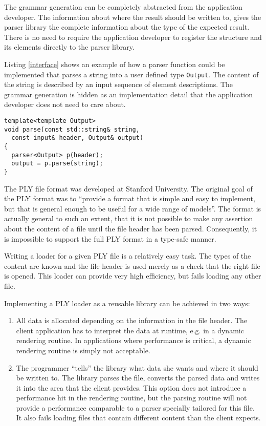\documentclass[a4paper,parskip=half,twocolumn]{scrartcl}
\begin{document}
The grammar generation can be completely abstracted from the application
developer. The information about where the result should be written to, gives
the parser library the complete information about the type of the expected
result. There is no need to require the application developer to register
the structure and its elements directly to the parser library.

Listing \ref{interface} shows an example of how a parser function could be
implemented that parses a string into a user defined type \texttt{Output}. The
content of the string is described by an input sequence of element descriptions.
The grammar generation is hidden as an implementation detail that the
application developer does not need to care about.

\begin{lstlisting}[frame=tb,label=interface,caption=parser interface]
template<template Output>
void parse(const std::string& string,
  const input& header, Output& output)
{
  parser<Output> p(header);
  output = p.parse(string);
}
\end{lstlisting}




The PLY file format was developed at Stanford University. The original goal of
the PLY format was to ``provide a format that is simple and easy to implement,
but that is general enough to be useful for a wide range of models''. The format
is actually general to such an extent, that it is not possible to make any
assertion about the content of a file until the file header has been parsed.
Consequently, it is impossible to support the full PLY format in a type-safe
manner.

Writing a loader for a given PLY file is a relatively easy task. The types of
the content are known and the file header is used merely as a check that the
right file is opened. This loader can provide very high efficiency, but fails
loading any other file.

Implementing a PLY loader as a reusable library can be achieved in two ways:
\begin{enumerate}
  \item All data is allocated depending on the information in the file header.
  The client application has to interpret the data at runtime, e.g. in a dynamic
  rendering routine. In applications where performance is critical, a dynamic
  rendering routine is simply not acceptable.
  \item The programmer ``tells'' the library what data she wants and where it
  should be written to. The library parses the file, converts the parsed data
  and writes it into the area that the client provides. This option does not
  introduce a performance hit in the rendering routine, but the parsing routine
  will not provide a performance comparable to a parser specially tailored for
  this file. It also fails loading files that contain different content than the
  client expects.
\end{enumerate}
\end{document}
